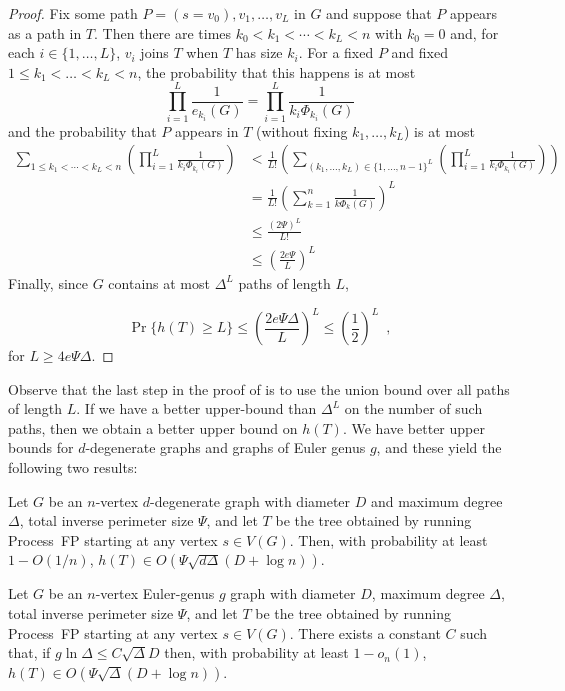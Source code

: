 \documentclass[lotsofwhite]{patmorin}
\begin{document}
\begin{proof}
   Fix some path $P=(s=v_0),v_1,\ldots,v_L$ in $G$ and suppose that $P$
   appears as a path in $T$.  Then there are times $k_0<k_1<\cdots<k_L<n$
   with $k_0=0$ and, for each $i\in\{1,\ldots,L\}$, $v_i$ joins $T$ when
   $T$ has size $k_i$.  For a fixed $P$ and fixed $1\le k_1<\ldots<k_L<n$,
   the probability that this happens is at most
   \[
       \prod_{i=1}^{L} \frac{1}{e_{k_i}(G)} 
           = \prod_{i=1}^{L} \frac{1}{k_i\Phi_{k_i}(G)} 
   \]  
   and the probability that $P$ appears in $T$ (without fixing
   $k_1,\ldots,k_L$) is at most
   \begin{align*}
       \sum_{1\le k_1<\cdots<k_L< n}
        \left(
         \prod_{i=1}^{L} \frac{1}{k_i\Phi_{k_i}(G)}
        \right) &
       < 
       \frac{1}{L!}\left(\sum_{(k_1,\ldots,k_L)\in\{1,\ldots,n-1\}^L}
        \left(
         \prod_{i=1}^{L} \frac{1}{k_i\Phi_{k_i}(G)}
        \right)\right)  \\
       &= \frac{1}{L!}\left(\sum_{k=1}^n\frac{1}{k\Phi_k(G)}\right)^L \\
       &\le \frac{(2\Psi)^L}{L!} \\
       &\le \left(\frac{2e\Psi}{L}\right)^L
   \end{align*}
   Finally, since $G$ contains at most $\Delta^L$ paths of length $L$,
   
   \[
        \Pr\{h(T) \ge L\} \le \left(\frac{2e\Psi\Delta}{L}\right)^L
         \le \left(\frac{1}{2}\right)^L \enspace ,
   \]
   for $L\ge 4e\Psi\Delta$.
\end{proof}

Observe that the last step in the proof of
 is to use the union bound over all
paths of length $L$.  If we have a better upper-bound than $\Delta^L$ on
the number of such paths, then we obtain a better upper bound on $h(T)$.
We have better upper bounds for $d$-degenerate graphs and graphs of
Euler genus $g$, and these yield the following two results:

\begin{cor}
  Let $G$ be an $n$-vertex $d$-degenerate graph with diameter $D$ and
  maximum degree $\Delta$, total inverse perimeter size $\Psi$,
  and let $T$ be the tree obtained by running
  Process~FP starting at any vertex $s\in V(G)$.  Then, with probability
  at least $1-O(1/n)$, $h(T)\in O(\Psi\sqrt{d\Delta}(D+\log n))$.
\end{cor}

\begin{cor}
  Let $G$ be an $n$-vertex Euler-genus $g$ graph with diameter $D$,
  maximum degree $\Delta$, total inverse perimeter size $\Psi$, and let
  $T$ be the tree obtained by running Process~FP starting at any vertex
  $s\in V(G)$.  There exists a constant $C$ such that, if $g\ln\Delta \le
  C\sqrt{\Delta}D$ then, with probability at least $1-o_n(1)$, $h(T)\in
  O(\Psi\sqrt{\Delta}(D+\log n))$.
\end{cor}
\end{document}
